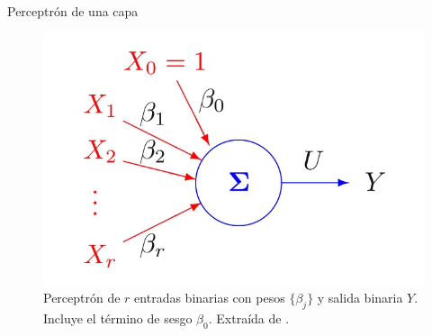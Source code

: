 \documentclass[spanish]{beamer}
\begin{document}
\begin{frame}{Perceptrón de una capa}
  \begin{figure}[h]
    \centering
    \includegraphics[width=.7\textwidth]{img/perceptron}
    \caption{Perceptrón de $r$ entradas binarias con pesos $\{\beta_j\}$ y salida binaria $Y$. Incluye el término de sesgo $\beta_0$. Extraída de \parencite{izenman_modern_2008}.}
    \label{fig:perceptron}
  \end{figure}
\end{frame}
\end{document}
